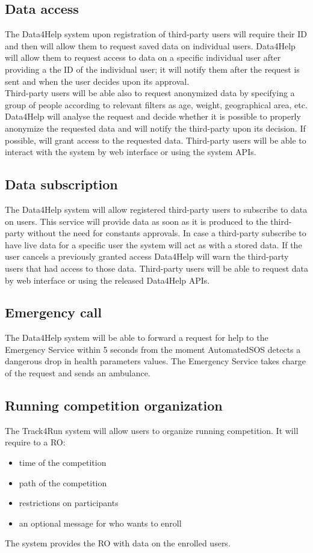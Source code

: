 \subsection{Data access}
The Data4Help system upon registration of third-party users will require their ID and then will allow them to request saved data on individual users. Data4Help will allow them to request access to data on a specific individual user after providing a the ID of the individual user; it will notify them after the request is sent and when the user decides upon its approval. \\
Third-party users will be able also to request anonymized data by specifying a group of people according to relevant filters as age, weight, geographical area, etc. 
Data4Help will analyse the request and decide whether it is possible to properly anonymize the requested data and will notify the third-party upon its decision. If possible, will grant access to the requested data. Third-party users will be able to interact with the system by web interface or using the system APIs.
\subsection{Data subscription}
The Data4Help system will allow registered third-party users to subscribe to data on users. This service will provide data as soon as it is produced to the third-party without the need for constants approvals.
In case a third-party subscribe to have live data for a specific user the system will act as with a stored data. If the user cancels a previously granted access Data4Help will warn the third-party users that had access to those data. Third-party users will be able to request data by web interface or using the released Data4Help APIs.
\\
\subsection{Emergency call}
The Data4Help system will be able to forward a request for help to the Emergency Service within 5 seconds from the moment AutomatedSOS detects a dangerous drop in health parameters values. The Emergency Service takes charge of the request and sends an ambulance. 
\\
\subsection{Running competition organization}
The Track4Run system will allow users to organize running competition. It will require to a RO: 
\begin{itemize}
\item time of the competition
\item path of the competition
\item restrictions on participants 
\item an optional message for who wants to enroll 
\end{itemize}
The system provides the RO with data on the enrolled users.
